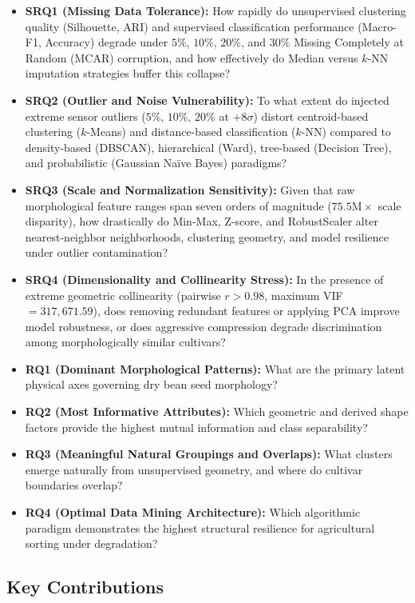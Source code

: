 \documentclass[11pt,a4paper]{article}
\begin{document}
\begin{itemize}[leftmargin=1.5em]
    \item \textbf{SRQ1 (Missing Data Tolerance):} How rapidly do unsupervised clustering quality (Silhouette, ARI) and supervised classification performance (Macro-F1, Accuracy) degrade under $5\%$, $10\%$, $20\%$, and $30\%$ Missing Completely at Random (MCAR) corruption, and how effectively do Median versus $k$-NN imputation strategies buffer this collapse?
    \item \textbf{SRQ2 (Outlier and Noise Vulnerability):} To what extent do injected extreme sensor outliers ($5\%$, $10\%$, $20\%$ at $+8\sigma$) distort centroid-based clustering ($k$-Means) and distance-based classification ($k$-NN) compared to density-based (DBSCAN), hierarchical (Ward), tree-based (Decision Tree), and probabilistic (Gaussian Naïve Bayes) paradigms?
    \item \textbf{SRQ3 (Scale and Normalization Sensitivity):} Given that raw morphological feature ranges span seven orders of magnitude ($75.5\text{M}\times$ scale disparity), how drastically do Min-Max, Z-score, and RobustScaler alter nearest-neighbor neighborhoods, clustering geometry, and model resilience under outlier contamination?
    \item \textbf{SRQ4 (Dimensionality and Collinearity Stress):} In the presence of extreme geometric collinearity (pairwise $r > 0.98$, maximum VIF $= 317{,}671.59$), does removing redundant features or applying PCA improve model robustness, or does aggressive compression degrade discrimination among morphologically similar cultivars?
    \item \textbf{RQ1 (Dominant Morphological Patterns):} What are the primary latent physical axes governing dry bean seed morphology?
    \item \textbf{RQ2 (Most Informative Attributes):} Which geometric and derived shape factors provide the highest mutual information and class separability?
    \item \textbf{RQ3 (Meaningful Natural Groupings and Overlaps):} What clusters emerge naturally from unsupervised geometry, and where do cultivar boundaries overlap?
    \item \textbf{RQ4 (Optimal Data Mining Architecture):} Which algorithmic paradigm demonstrates the highest structural resilience for agricultural sorting under degradation?
\end{itemize}

\subsection{Key Contributions}
\label{subsec:contributions}
\end{document}
